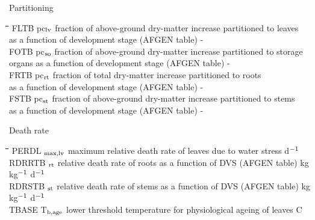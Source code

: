 \documentclass[11pt]{article}
\begin{document}
\bigskip
Partitioning\nwln
\begin{tabbing}
\hspace{1.27cm}\=\hspace{1.27cm}\=\hspace{1.27cm}\=\hspace{1.27cm}\=%
\hspace{1.27cm}\=\hspace{1.27cm}\=\hspace{1.27cm}\=\hspace{1.27cm}\=%
\hspace{1.27cm}\=\hspace{1.27cm}\=\kill
FLTB\> \> pc$_{{\rm lv}}$\> fraction of above-ground dry-matter increase partitioned to leaves\\
\>\> \> as a function of development stage (AFGEN table)\> \> \> \> \> \> \> -\\
FOTB\> \> pc$_{{\rm so}}$\> fraction of above-ground dry-matter increase partitioned to storage\\
\>\> \> organs as a function of development stage (AFGEN table)\> \> \> \> \> \> \> -\\
FRTB\> \> pc$_{{\rm rt}}$\> fraction of total dry-matter increase partitioned to roots\\
\>\> \> as a function of development stage (AFGEN table)\> \> \> \> \> \> \> -\\
FSTB\> \> pc$_{{\rm st}}$\> fraction of above-ground dry-matter increase partitioned to stems\\
\>\> \> as a function of development stage (AFGEN table)\> \> \> \> \> \> \> -
\end{tabbing}

\bigskip
Death rate\nwln
\begin{tabbing}
\hspace{1.27cm}\=\hspace{1.27cm}\=\hspace{1.27cm}\=\hspace{1.27cm}\=%
\hspace{1.27cm}\=\hspace{1.27cm}\=\hspace{1.27cm}\=\hspace{1.27cm}\=%
\hspace{1.27cm}\=\hspace{1.27cm}\=\kill
PERDL\> \> \dag $_{{\rm max,lv}}$\> maximum relative death rate of leaves due to water stress\> \> \> \> \> \> \> d$^{{\rm -1}}$\\
RDRRTB\> \> \dag $_{{\rm rt}}$\> relative death rate of roots as a function of DVS (AFGEN table)\> \> \> \> \> \> \> kg kg$^{{\rm -1}}$ d$^{{\rm -1}}$\\
RDRSTB\> \> \dag $_{{\rm st}}$\> relative death rate of stems as a function of DVS (AFGEN table)\> \> \> \> \> \> \> kg kg$^{{\rm -1}}$ d$^{{\rm -1}}$\\
TBASE\> \> T$_{{\rm b,age}}$\> lower threshold temperature for physiological ageing of leaves\> \> \> \> \> \> \> \degrees C 
\end{tabbing}
\end{document}
